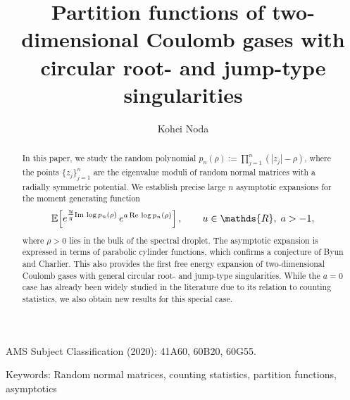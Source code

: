 \documentclass[reqno]{amsart}
\title[Partition functions of two-dimensional Coulomb gases with circular root- and jump-type singularities]{Partition functions of two-dimensional Coulomb gases with circular root- and jump-type singularities}
\author[K. Noda]{Kohei Noda}
\newcommand{\1}{\mathds{1}}
\newcommand{\R}{\mathds{R}}
\newcommand{\re}{\text{\upshape Re\,}}
\newcommand{\im}{\text{\upshape Im\,}}
\numberwithin{equation}{section}
\theoremstyle{definition}
\begin{document}
\maketitle



\begin{abstract}
In this paper, we study the random polynomial $p_n(\rho):=\prod_{j=1}^n (|z_j|-\rho)$, where the points $\{z_j\}_{j=1}^n$ are the eigenvalue moduli of random normal matrices with a radially symmetric potential. %
We establish precise large $n$ asymptotic expansions for the moment generating function 
\[
\mathbb{E}\!\left[e^{\tfrac{u}{\pi}\im\log p_n(\rho)}\, e^{a\,\re\log p_n(\rho)}\right],  
\qquad u\in\R, \; a>-1,
\]
where $\rho>0$ lies in the bulk of the spectral droplet. The asymptotic expansion is expressed in terms of parabolic cylinder functions, which confirms a conjecture of Byun and Charlier. This also provides the first free energy expansion of two-dimensional Coulomb gases with general circular root- and jump-type singularities. 
While the $a=0$ case has already been widely studied in the literature due to its relation to counting statistics, we also obtain new results for this special case.   
\end{abstract}
\noindent
{\small{\sc AMS Subject Classification (2020)}: 41A60, 60B20, 60G55.}

\noindent
{\small{\sc Keywords}: Random normal matrices, counting statistics, partition functions, asymptotics}
\end{document}
